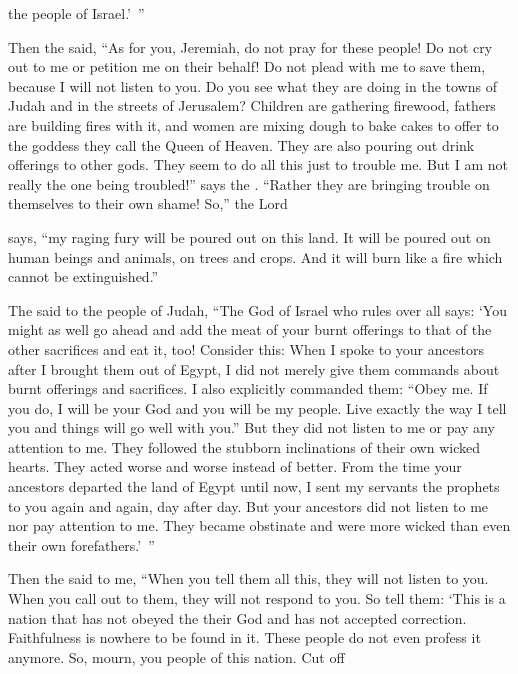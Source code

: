{the people
of Israel.’ ”
\par }{\PP {}Then the
{} said, “As for you,
Jeremiah, do not
pray
for
these
people! Do not
cry out
to me or petition
me on their behalf! Do not
plead
with me to save them, because
I will not
listen to you.
Do
you see
what
they
are doing
in the towns
of Judah
and in the streets
of Jerusalem?
Children
are gathering
firewood,
fathers
are building
fires
with it, and
women
are mixing
dough
to bake cakes
to offer
to the goddess they call the Queen
of Heaven.
They are
also pouring
out drink offerings
to other
gods.
They seem to do
all this
just
to trouble me.
But
I am not
really
the one being troubled!” says
the {}. “Rather
they are bringing trouble on themselves to their own shame!
So,”
the Lord

{}
says,
“my raging
fury
will be poured
out on
this
land.
It will be poured
out on
human
beings and animals,
on
trees
and crops.
And it will burn
like a fire which cannot
be extinguished.”
\par }{\PP {}The
{} said
to the people of Judah, “The
{}
God
of Israel
who rules over all
says: ‘You might as well go ahead and add
the meat
of your burnt offerings
to that of the other sacrifices
and eat it, too!
Consider this: When
I spoke
to your ancestors
after
I brought them out
of Egypt,
I did not
merely
give them commands about
burnt offerings
and sacrifices.
I also
explicitly
commanded
them: “Obey
me.
If
you do, I will be
your God
and you
will be
my people.
Live
exactly
the way
I tell you
and things will
go well with you.”
But they did not
listen
to me or
pay
any attention
to me. They followed
the stubborn inclinations
of their own wicked
hearts.
They acted
worse and worse
instead
of better.
From
the time
your ancestors
departed
the land
of Egypt
until
now, I sent
my servants
the prophets
to you again
and again,
day
after day.
But your ancestors
did not
listen
to
me nor
pay
attention
to me. They became obstinate
and were more wicked
than even their own forefathers.’ ”
\par }{\PP {}Then the
{} said
to
me, “When you tell them
all
this,
they will not
listen
to
you. When you call
out to
them, they will not
respond to you.
So tell
them: ‘This
is a nation
that has not
obeyed
the {}
their God
and has not
accepted
correction.
Faithfulness
is nowhere to be found
in it. These people do not even profess it anymore.
So, mourn, you people of this nation. Cut off
}
